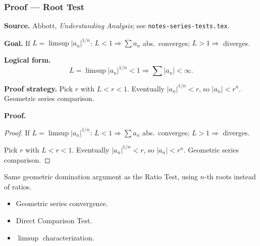 
\clearpage
{}
\hypertarget{proof-RA-ABB-T-root-test}{}

\subsubsection[Root Test]{Proof --- Root Test}

\bigskip

\noindent
\textbf{Source.}
Abbott, \emph{Understanding Analysis}; see \texttt{notes-series-tests.tex}.

\vspace{0.75em}

\noindent
\textbf{Goal.}
If $L = \limsup |a_n|^{1/n}$: $L < 1 \Rightarrow \sum a_n$ abs.\ converges; $L > 1 \Rightarrow$ diverges.

\vspace{0.75em}

\noindent
\textbf{Logical form.}
\[
  L = \limsup |a_n|^{1/n} < 1 \Rightarrow \sum |a_n| < \infty.
\]

\vspace{0.75em}

\noindent
\textbf{Proof strategy.}
Pick $r$ with $L < r < 1$. Eventually $|a_n|^{1/n} < r$, so $|a_n| < r^n$. Geometric series comparison.

\vspace{0.75em}

\noindent
\textbf{Proof.}
\begin{proof}
\Claim If $L = \limsup |a_n|^{1/n}$: $L < 1 \Rightarrow \sum a_n$ abs.\ converges; $L > 1 \Rightarrow$ diverges.

\Given 

\Goal 

\Strategy Pick $r$ with $L < r < 1$. Eventually $|a_n|^{1/n} < r$, so $|a_n| < r^n$. Geometric series comparison.

\medskip


\end{proof}

\begin{remark*}
Same geometric domination argument as the Ratio Test, using $n$-th roots instead of ratios.
\end{remark*}

\begin{remark*}[Dependencies]
\begin{itemize}
  \item Geometric series convergence.
  \item Direct Comparison Test.
  \item $\limsup$ characterization.
\end{itemize}
\end{remark*}
